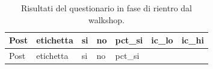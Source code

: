\documentclass[
  a4paper,
]{book}
\begin{document}
\begin{longtable}[]{@{}
  >{\raggedright\arraybackslash}p{}
  >{\raggedright\arraybackslash}p{}
  >{\raggedleft\arraybackslash}p{}
  >{\raggedleft\arraybackslash}p{}
  >{\raggedleft\arraybackslash}p{}
  >{\raggedleft\arraybackslash}p{}
  >{\raggedleft\arraybackslash}p{}@{}}
\caption{\label{tab:questionarioPost} Risultati del questionario in fase di rientro dal walkshop.}\tabularnewline
\toprule\noalign{}
\begin{minipage}[b]{\linewidth}\raggedright
Post
\end{minipage} & \begin{minipage}[b]{\linewidth}\raggedright
etichetta
\end{minipage} & \begin{minipage}[b]{\linewidth}\raggedleft
si
\end{minipage} & \begin{minipage}[b]{\linewidth}\raggedleft
no
\end{minipage} & \begin{minipage}[b]{\linewidth}\raggedleft
pct\_si
\end{minipage} & \begin{minipage}[b]{\linewidth}\raggedleft
ic\_lo
\end{minipage} & \begin{minipage}[b]{\linewidth}\raggedleft
ic\_hi
\end{minipage} \\
\midrule\noalign{}
\endfirsthead
\toprule\noalign{}
\begin{minipage}[b]{\linewidth}\raggedright
Post
\end{minipage} & \begin{minipage}[b]{\linewidth}\raggedright
etichetta
\end{minipage} & \begin{minipage}[b]{\linewidth}\raggedleft
si
\end{minipage} & \begin{minipage}[b]{\linewidth}\raggedleft
no
\end{minipage} & \begin{minipage}[b]{\linewidth}\raggedleft
pct\_si
\end{minipage} & \begin{minipage}[b]{\linewidth}\raggedleft

\end{minipage}
\end{longtable}
\end{document}
